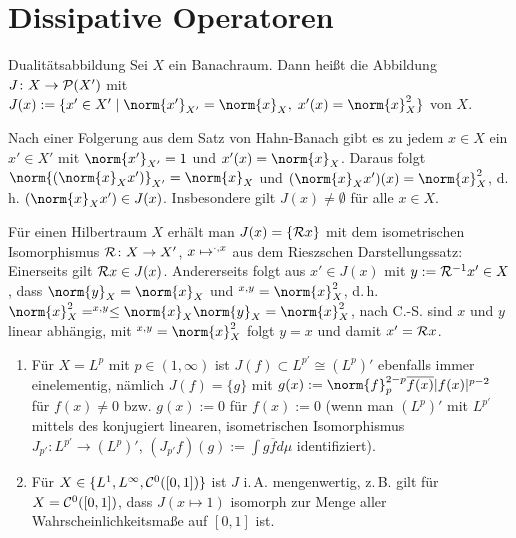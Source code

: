 \section{%
    Dissipative Operatoren%
}

\begin{Def}{Dualitätsabbildung}
    Sei $X$ ein Banachraum.
    Dann heißt die Abbildung $J\colon X \to \P(X')$ mit
    $J(x) := \{x' \in X' \;|\; \norm{x'}_{X'} = \norm{x}_X,\; x'(x) = \norm{x}_X^2\}$
     von $X$.
\end{Def}

\linie

\begin{Bem}
    Nach einer Folgerung aus dem Satz von Hahn-Banach gibt es zu jedem $x \in X$
    ein $x' \in X'$ mit $\norm{x'}_{X'} = 1$ und
    $x'(x) = \norm{x}_X$.
    Daraus folgt $\norm{(\norm{x}_X x')}_{X'} = \norm{x}_X$ und
    $(\norm{x}_X x')(x) = \norm{x}_X^2$, d.\,h. $(\norm{x}_X x') \in J(x)$.
    Insbesondere gilt $J(x) \not= \emptyset$ für alle $x \in X$.
\end{Bem}

\begin{Bem}
    Für einen Hilbertraum $X$ erhält man $J(x) = \{\R x\}$ mit dem isometrischen Isomorphismus
    $\R\colon X \to X'$, $x \mapsto \sp{\cdot, x}$ aus dem Rieszschen Darstellungssatz:
    Einerseits gilt $\R x \in J(x)$.
    Andererseits folgt aus $x' \in J(x)$ mit $y := \R^{-1} x' \in X$,
    dass $\norm{y}_X = \norm{x}_X$ und $\sp{x, y} = \norm{x}_X^2$,
    d.\,h. $\norm{x}_X^2 = \sp{x, y} \le \norm{x}_X \norm{y}_X = \norm{x}_X^2$,
    nach C.-S. sind $x$ und $y$ linear abhängig, mit $\sp{x, y} = \norm{x}_X^2$ folgt $y = x$
    und damit $x' = \R x$.
\end{Bem}

\begin{Bsp}
    \begin{enumerate}
        \item
        Für $X = L^p$ mit $p \in (1, \infty)$ ist $J(f) \subset L^{p'} \cong (L^p)'$ ebenfalls immer
        einelementig, nämlich $J(f) = \{g\}$ mit
        $g(x) := \norm{f}_p^{2-p} \overline{f(x)} |f(x)|^{p-2}$ für $f(x) \not= 0$
        bzw. $g(x) := 0$ für $f(x) := 0$
        (wenn man $(L^p)'$ mit $L^{p'}$ mittels des konjugiert linearen, isometrischen Isomorphismus
        $J_{p'}\colon L^{p'} \to (L^p)'$, $(J_{p'} f)(g) := \int g \overline{f} d\mu$
        identifiziert).

        \item
        Für $X \in \{L^1, L^\infty, \C^0([0, 1])\}$ ist $J$ i.\,A. mengenwertig,
        z.\,B. gilt für $X = \C^0([0, 1])$, dass $J(x \mapsto 1)$
        isomorph zur Menge aller Wahrscheinlichkeitsmaße auf $[0, 1]$ ist.
    \end{enumerate}
\end{Bsp}

